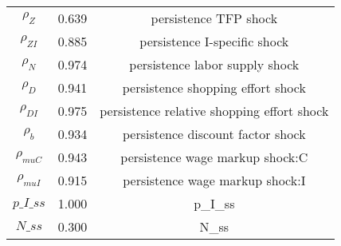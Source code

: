 \begin{center}
\begin{longtable}{ccc}
${\rho_Z}$ 	 & 	 0.639 	 & 	 persistence TFP shock\\
${\rho_{ZI}}$ 	 & 	 0.885 	 & 	 persistence I-specific shock\\
${\rho_N}$ 	 & 	 0.974 	 & 	 persistence labor supply shock\\
${\rho_D}$ 	 & 	 0.941 	 & 	 persistence shopping effort shock\\
${\rho_{DI}}$ 	 & 	 0.975 	 & 	 persistence relative shopping effort shock\\
${\rho_b}$ 	 & 	 0.934 	 & 	 persistence discount factor shock\\
${\rho_{muC}}$ 	 & 	 0.943 	 & 	 persistence wage markup shock:C\\
${\rho_{muI}}$ 	 & 	 0.915 	 & 	 persistence wage markup shock:I\\
$p\_I\_ss$ 	 & 	 1.000 	 & 	 p\_I\_ss\\
$N\_ss$ 	 & 	 0.300 	 & 	 N\_ss\\
\bottomrule%
\end{longtable}
\end{center}
